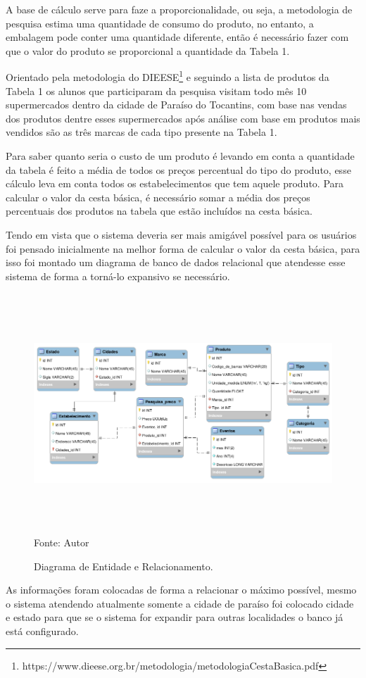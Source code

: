 \documentclass{ifto-tex}
\begin{document}
A base de cálculo serve para faze a proporcionalidade, ou seja, a metodologia de pesquisa estima uma quantidade de consumo do produto, no entanto, a embalagem pode conter uma quantidade diferente, então é necessário fazer com que o valor do produto se proporcional a quantidade da Tabela 1.

Orientado pela metodologia do DIEESE\footnote{https://www.dieese.org.br/metodologia/metodologiaCestaBasica.pdf} e seguindo a lista de produtos da Tabela 1 os alunos que participaram da pesquisa visitam todo mês 10 supermercados dentro da cidade de Paraíso do Tocantins, com base nas vendas dos produtos dentre esses supermercados após análise com base em produtos mais vendidos são as três marcas de cada tipo presente na Tabela 1.


Para saber quanto seria o custo de um produto é levando em conta a quantidade da tabela é feito a média de todos os preços percentual do tipo do produto, esse cálculo leva em conta todos os estabelecimentos que tem aquele produto. Para calcular o valor da cesta básica, é necessário somar a média dos preços percentuais dos produtos na tabela que estão incluídos na cesta básica.


Tendo em vista que o sistema deveria ser mais amigável  possível para os usuários foi pensado inicialmente na melhor forma de calcular o valor da cesta básica, para isso foi montado um diagrama de banco de dados relacional que atendesse esse sistema de forma a torná-lo expansivo se necessário.
\begin{figure}[H]
	\begin{center}
		\includegraphics[width=16.0cm, height= 9.0cm]{cestadiagrama.png}    %
		Fonte: Autor
		\caption{Diagrama de Entidade e Relacionamento.} 
		
		\label{fig:faces}
	\end{center}
\end{figure}
As informações foram colocadas de forma a relacionar o máximo possível, mesmo o sistema atendendo atualmente somente a cidade de paraíso foi colocado cidade e estado para que se o sistema for expandir para outras localidades o banco já está configurado.
\end{document}
